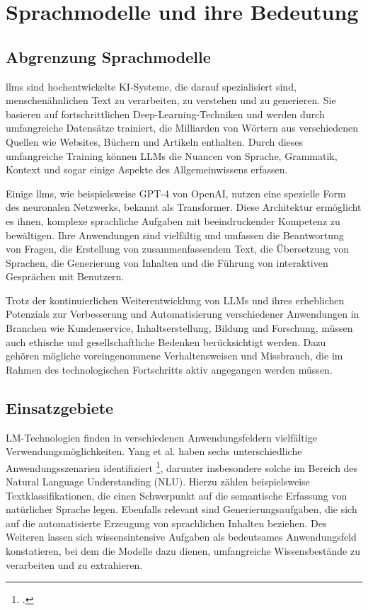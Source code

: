\section{Sprachmodelle und ihre Bedeutung}
\subsection{Abgrenzung Sprachmodelle}
\acp{llm} sind hochentwickelte KI-Systeme, die darauf spezialisiert sind, menschenähnlichen Text zu verarbeiten, zu verstehen und zu generieren. Sie basieren auf fortschrittlichen Deep-Learning-Techniken und werden durch umfangreiche Datensätze trainiert, die Milliarden von Wörtern aus verschiedenen Quellen wie Websites, Büchern und Artikeln enthalten. Durch dieses umfangreiche Training können LLMs die Nuancen von Sprache, Grammatik, Kontext und sogar einige Aspekte des Allgemeinwissens erfassen. %

Einige \acp{llm}, wie beispielsweise GPT-4 von OpenAI, nutzen eine spezielle Form des neuronalen Netzwerks, bekannt als Transformer. Diese Architektur ermöglicht es ihnen, komplexe sprachliche Aufgaben mit beeindruckender Kompetenz zu bewältigen. Ihre Anwendungen sind vielfältig und umfassen die Beantwortung von Fragen, die Erstellung von zusammenfassendem Text, die Übersetzung von Sprachen, die Generierung von Inhalten und die Führung von interaktiven Gesprächen mit Benutzern. %

Trotz der kontinuierlichen Weiterentwicklung von LLMs und ihres erheblichen Potenzials zur Verbesserung und Automatisierung verschiedener Anwendungen in Branchen wie Kundenservice, Inhaltserstellung, Bildung und Forschung, müssen auch ethische und gesellschaftliche Bedenken berücksichtigt werden. Dazu gehören mögliche voreingenommene Verhaltensweisen und Missbrauch, die im Rahmen des technologischen Fortschritts aktiv angegangen werden müssen. %

\subsection{Einsatzgebiete}
LM-Technologien finden in verschiedenen Anwendungsfeldern vielfältige Verwendungsmöglichkeiten. Yang et al. haben sechs unterschiedliche Anwendungsszenarien identifiziert \footcite[Vgl.][S. 6 ff.]{yang2023harnessing}, darunter insbesondere solche im Bereich des Natural Language Understanding (NLU). Hierzu zählen beispielsweise Textklassifikationen, die einen Schwerpunkt auf die semantische Erfassung von natürlicher Sprache legen. Ebenfalls relevant sind Generierungsaufgaben, die sich auf die automatisierte Erzeugung von sprachlichen Inhalten beziehen. Des Weiteren lassen sich wissensintensive Aufgaben als bedeutsames Anwendungsfeld konstatieren, bei dem die Modelle dazu dienen, umfangreiche Wissensbestände zu verarbeiten und zu extrahieren. %

